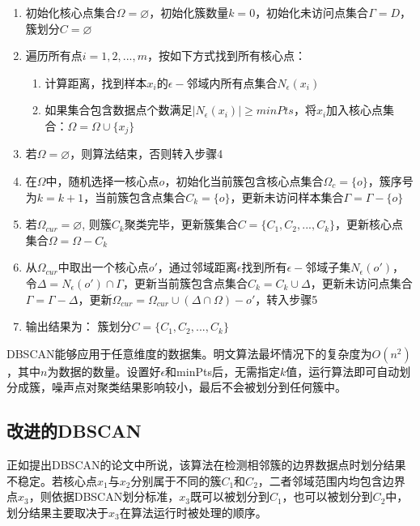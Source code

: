 \begin{enumerate}
	\item 初始化核心点集合$ \Omega = \varnothing  $，初始化簇数量$ k=0 $，初始化未访问点集合$ \Gamma = D $，簇划分$ C=\varnothing $
	\item 遍历所有点$ i=1,2,...,m $，按如下方式找到所有核心点：
	      \begin{enumerate}
		      \item 计算距离，找到样本$ x_i $的$ \epsilon- $邻域内所有点集合$ N_{\epsilon}(x_i) $
		      \item 如果集合包含数据点个数满足$ |N_{\epsilon}(x_i)| \geq minPts $，将$ x_i $加入核心点集合：$ \Omega = \Omega \cup \{x_j\} $
	      \end{enumerate}
	\item 若$ \Omega = \varnothing $，则算法结束，否则转入步骤4
	\item 在$ \Omega $中，随机选择一核心点$ o $，初始化当前簇包含核心点集合$ \Omega_{c}=\{o\} $，簇序号为$ k=k+1 $，当前簇包含点集合$ C_k=\{o\} $，更新未访问样本集合$ \Gamma = \Gamma - \{o\} $
	\item 若$ \Omega_{cur} = \varnothing $, 则簇$ C_k $聚类完毕，更新簇集合$ C=\{C_1,C_2,...,C_k\} $，更新核心点集合$ \Omega = \Omega - C_k $
	\item 从$ \Omega_{cur} $中取出一个核心点$ o' $，通过邻域距离$ \epsilon $找到所有$ \epsilon- $邻域子集$ N_{\epsilon}(o')  $，令$ \Delta = N_{\epsilon}(o') \cap \Gamma $，更新当前簇包含点集合$ C_k = C_k \cup \Delta $，更新未访问点集合$ \Gamma = \Gamma - \Delta $，更新$ \Omega_{cur} = \Omega_{cur}\cup(\Delta\cap\Omega)-o' $，转入步骤5
	\item 输出结果为： 簇划分$ C=\{C_1,C_2,...,C_k\} $
\end{enumerate}

DBSCAN能够应用于任意维度的数据集。明文算法最坏情况下的复杂度为$ O(n^2) $，其中$ n $为数据的数量。设置好$ \epsilon $和minPts后，无需指定$ k $值，运行算法即可自动划分成簇，噪声点对聚类结果影响较小，最后不会被划分到任何簇中。

\subsection{改进的DBSCAN}
正如提出DBSCAN的论文\cite{ester1996density}中所说，该算法在检测相邻簇的边界数据点时划分结果不稳定。若核心点$ x_1 $与$ x_2 $分别属于不同的簇$ C_1 $和$ C_2 $，二者邻域范围内均包含边界点$ x_3 $，则依据DBSCAN划分标准，$ x_3 $既可以被划分到$ C_1 $，也可以被划分到$ C_2 $中，划分结果主要取决于$ x_3 $在算法运行时被处理的顺序。

